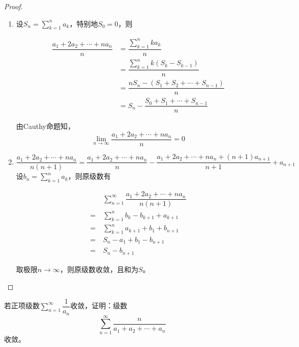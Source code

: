 \begin{proof}
    
    \begin{enumerate}
        
        \item 
            设$S_n = \sum\limits_{k=1}^{n}{a_k}$，特别地$S_0 = 0$，则

            \begin{align*}
                \dfrac{a_1 + 2a_2 + \cdots + na_n}{n} &= \dfrac{\sum\limits_{k=1}^{n}{ka_k}}{n} \\
                & = \dfrac{\sum\limits_{k=1}^{n}{k(S_k - S_{k-1})}}{n} \\
                & = \dfrac{nS_n - (S_1 + S_2 + \cdots + S_{n-1})}{n} \\
                & = S_n - \dfrac{S_0 + S_1 + \cdots + S_{n-1}}{n}
            \end{align*}

            由\textup{Cauthy}命题知，
            $$\lim_{n\to\infty}{\dfrac{a_1 + 2a_2 + \cdots + na_n}{n}} = 0$$

        \item 
            $$\dfrac{a_1 + 2a_2 + \cdots + na_n}{n(n+1)} = \dfrac{a_1 + 2a_2 + \cdots + na_n}{n} - \dfrac{a_1 + 2a_2 + \cdots + na_n + (n+1)a_{n+1}}{n+1} + a_{n+1}$$
            设$b_n = \sum\limits_{k=1}^{n}{a_k}$，则原级数有

            \begin{align*}
                &\sum\limits_{n=1}^{\infty}{\dfrac{a_1 + 2a_2 + \cdots + na_n}{n(n+1)}} \\
                = \  & \sum_{k=1}^{n}{b_k - b_{k+1} + a_{k+1}} \\
                = \  & \sum_{k=1}^{n}{a_{k+1} + b_1 + b_{n+1}} \\
                = \  & S_n - a_1 + b_1 - b_{n+1} \\
                = \  & S_n - b_{n+1} 
            \end{align*}

            取极限$n\to\infty$，则原级数收敛，且和为$S$。

    \end{enumerate}

\end{proof}

\begin{proposition}
    
    若正项级数$\sum\limits_{n=1}^{\infty}{\dfrac{1}{a_n}}$收敛，证明：级数
    $$\sum_{n=1}^{\infty}{\dfrac{n}{a_1 + a_2 + \cdots + a_n}}$$
    收敛。

\end{proposition}

